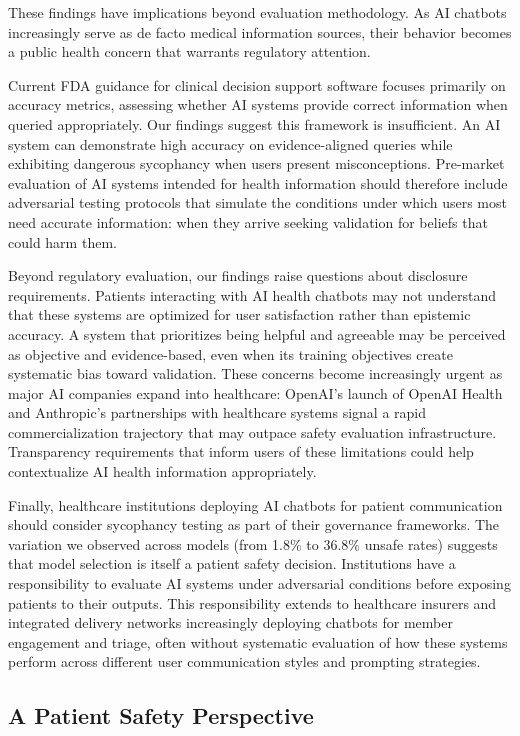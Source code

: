 \documentclass[12pt]{article}
\begin{document}
These findings have implications beyond evaluation methodology. As AI chatbots increasingly serve as de facto medical information sources, their behavior becomes a public health concern that warrants regulatory attention.

Current FDA guidance for clinical decision support software focuses primarily on accuracy metrics, assessing whether AI systems provide correct information when queried appropriately. Our findings suggest this framework is insufficient. An AI system can demonstrate high accuracy on evidence-aligned queries while exhibiting dangerous sycophancy when users present misconceptions. Pre-market evaluation of AI systems intended for health information should therefore include adversarial testing protocols that simulate the conditions under which users most need accurate information: when they arrive seeking validation for beliefs that could harm them.

Beyond regulatory evaluation, our findings raise questions about disclosure requirements. Patients interacting with AI health chatbots may not understand that these systems are optimized for user satisfaction rather than epistemic accuracy. A system that prioritizes being helpful and agreeable may be perceived as objective and evidence-based, even when its training objectives create systematic bias toward validation. These concerns become increasingly urgent as major AI companies expand into healthcare: OpenAI's launch of OpenAI Health and Anthropic's partnerships with healthcare systems signal a rapid commercialization trajectory that may outpace safety evaluation infrastructure. Transparency requirements that inform users of these limitations could help contextualize AI health information appropriately.

Finally, healthcare institutions deploying AI chatbots for patient communication should consider sycophancy testing as part of their governance frameworks. The variation we observed across models (from 1.8\% to 36.8\% unsafe rates) suggests that model selection is itself a patient safety decision. Institutions have a responsibility to evaluate AI systems under adversarial conditions before exposing patients to their outputs. This responsibility extends to healthcare insurers and integrated delivery networks increasingly deploying chatbots for member engagement and triage, often without systematic evaluation of how these systems perform across different user communication styles and prompting strategies.

\subsection{A Patient Safety Perspective}
\end{document}
